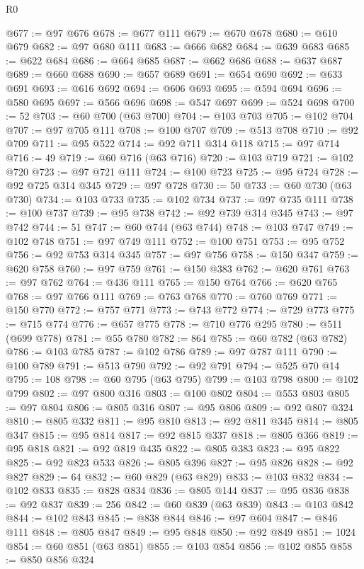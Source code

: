 \begin{lexlean}{R0}
\begin{coremodule}
@677 := @97 @676
@678 := @677 @111
@679 := @670 @678
@680 := @610 @679
@682 := @97 @680 @111
@683 := @666 @682
@684 := @639 @683
@685 := @622 @684
@686 := @664 @685
@687 := @662 @686
@688 := @637 @687
@689 := @660 @688
@690 := @657 @689
@691 := @654 @690
@692 := @633 @691
@693 := @616 @692
@694 := @606 @693
@695 := @594 @694
@696 := @580 @695
@697 := @566 @696
@698 := @547 @697
@699 := @524 @698
@700 := 52
@703 := @60 @700 (@63 @700)
@704 := @103 @703
@705 := @102 @704
@707 := @97 @705 @111
@708 := @100 @707
@709 := @513 @708
@710 := @92 @709
@711 := @95 @522
@714 := @92 @711 @314 @118
@715 := @97 @714
@716 := 49
@719 := @60 @716 (@63 @716)
@720 := @103 @719
@721 := @102 @720
@723 := @97 @721 @111
@724 := @100 @723
@725 := @95 @724
@728 := @92 @725 @314 @345
@729 := @97 @728
@730 := 50
@733 := @60 @730 (@63 @730)
@734 := @103 @733
@735 := @102 @734
@737 := @97 @735 @111
@738 := @100 @737
@739 := @95 @738
@742 := @92 @739 @314 @345
@743 := @97 @742
@744 := 51
@747 := @60 @744 (@63 @744)
@748 := @103 @747
@749 := @102 @748
@751 := @97 @749 @111
@752 := @100 @751
@753 := @95 @752
@756 := @92 @753 @314 @345
@757 := @97 @756
@758 := @150 @347
@759 := @620 @758
@760 := @97 @759
@761 := @150 @383
@762 := @620 @761
@763 := @97 @762
@764 := @436 @111
@765 := @150 @764
@766 := @620 @765
@768 := @97 @766 @111
@769 := @763 @768
@770 := @760 @769
@771 := @150 @770
@772 := @757 @771
@773 := @743 @772
@774 := @729 @773
@775 := @715 @774
@776 := @657 @775
@778 := @710 @776 @295
@780 := @511 (@699 @778)
@781 := @55 @780
@782 := 864
@785 := @60 @782 (@63 @782)
@786 := @103 @785
@787 := @102 @786
@789 := @97 @787 @111
@790 := @100 @789
@791 := @513 @790
@792 := @92 @791
@794 := @525 @70 @14
@795 := 108
@798 := @60 @795 (@63 @795)
@799 := @103 @798
@800 := @102 @799
@802 := @97 @800 @316
@803 := @100 @802
@804 := @553 @803
@805 := @97 @804
@806 := @805 @316
@807 := @95 @806
@809 := @92 @807 @324
@810 := @805 @332
@811 := @95 @810
@813 := @92 @811 @345
@814 := @805 @347
@815 := @95 @814
@817 := @92 @815 @337
@818 := @805 @366
@819 := @95 @818
@821 := @92 @819 @435
@822 := @805 @383
@823 := @95 @822
@825 := @92 @823 @533
@826 := @805 @396
@827 := @95 @826
@828 := @92 @827
@829 := 64
@832 := @60 @829 (@63 @829)
@833 := @103 @832
@834 := @102 @833
@835 := @828 @834
@836 := @805 @144
@837 := @95 @836
@838 := @92 @837
@839 := 256
@842 := @60 @839 (@63 @839)
@843 := @103 @842
@844 := @102 @843
@845 := @838 @844
@846 := @97 @604
@847 := @846 @111
@848 := @805 @847
@849 := @95 @848
@850 := @92 @849
@851 := 1024
@854 := @60 @851 (@63 @851)
@855 := @103 @854
@856 := @102 @855
@858 := @850 @856 @324

\end{coremodule}
\end{lexlean}
